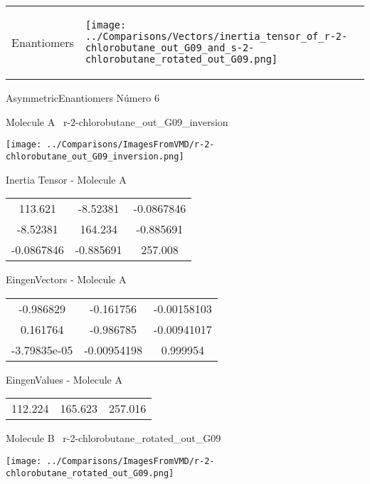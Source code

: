 \vtab[-5mm]
\begin{tabular}{*{2}{m{}}}
\begin{center}
\textcolor{NavyBlue}{\Large Enantiomers}
\end{center}
&
\begin{center}
\texttt{[image: ../Comparisons/Vectors/inertia\_tensor\_of\_r-2-chlorobutane\_out\_G09\_and\_s-2-chlorobutane\_rotated\_out\_G09.png]}
\end{center}
\end{tabular}

 \newpage

\vtab[-3cm]
\begin{center}
{\large AsymmetricEnantiomers \tab Número 6}
\end{center}
\begin{multicols}{2}
\begin{center}

Molecule A \
r-2-chlorobutane\_out\_G09\_inversion

\texttt{[image: ../Comparisons/ImagesFromVMD/r-2-chlorobutane\_out\_G09\_inversion.png]}

Inertia Tensor - Molecule A \\
\begin{tabular}{|c c c|}
113.621	 & 	-8.52381	 & 	-0.0867846	 \\
-8.52381	 & 	164.234	 & 	-0.885691	 \\
-0.0867846	 & 	-0.885691	 & 	257.008
\end{tabular}

\vtab
 EingenVectors - Molecule A     \\
\begin{tabular}{|c c c|}
-0.986829	 & 	-0.161756	 & 	-0.00158103	 \\
0.161764	 & 	-0.986785	 & 	-0.00941017	 \\
-3.79835e-05	 & 	-0.00954198	 & 	0.999954
\end{tabular}

\vtab
 EingenValues - Molecule A     \\
\begin{tabular}{|c c c|}
112.224	 & 	165.623	 & 	257.016	 \\
\end{tabular}
\columnbreak

Molecule B \
r-2-chlorobutane\_rotated\_out\_G09

\texttt{[image: ../Comparisons/ImagesFromVMD/r-2-chlorobutane\_rotated\_out\_G09.png]}


\end{center}
\end{multicols}
